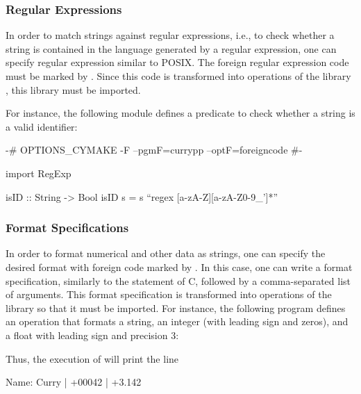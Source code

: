 \subsubsection{Regular Expressions}

In order to match strings against regular expressions, i.e.,
to check whether a string is contained in the language
generated by a regular expression, one can specify
regular expression similar to POSIX. The foreign regular
expression code must be marked by .
Since this code is transformed into operations of the \CYS library
, this library must be imported.

For instance, the following module defines a predicate
to check whether a string is a valid identifier:

\begin{curry}
{-# OPTIONS_CYMAKE -F --pgmF=currypp --optF=foreigncode #-}

import RegExp

isID :: String -> Bool
isID s = s ``regex [a-zA-Z][a-zA-Z0-9_']*''
\end{curry}


\subsubsection{Format Specifications}

In order to format numerical and other data as strings,
one can specify the desired format with foreign code marked by
. In this case, one can write a format specification,
similarly to the  statement of C,
followed by a comma-separated list of arguments.
This format specification is transformed into operations
of the \CYS library  so that it must be imported.
For instance, the following program defines an operation
that formats a string, an integer (with leading sign and zeros),
and a float with leading sign and precision 3:
Thus, the execution of  will print the line
\begin{curry}
Name: Curry | +00042 | +3.142
\end{curry}

